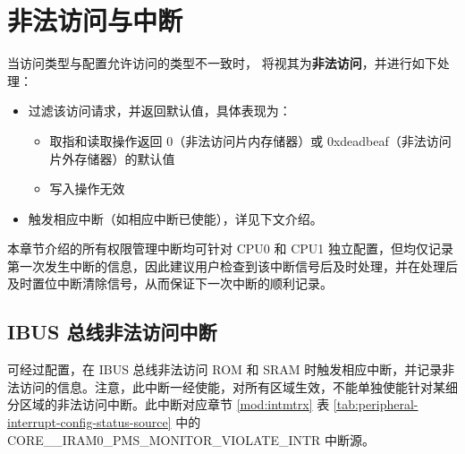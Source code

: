 \documentclass[main\_\_CN.tex]{subfiles}
\begin{document}
\section{非法访问与中断}

当访问类型与配置允许访问的类型不一致时，\chipname{} 将视其为\textbf{非法访问}，并进行如下处理：
\begin{itemize}
    \item 过滤该访问请求，并返回默认值，具体表现为：
    \begin{itemize}
        \item 取指和读取操作返回 0（非法访问片内存储器）或 0x{}deadbeaf（非法访问片外存储器）的默认值
        \item 写入操作无效
    \end{itemize}
    \item 触发相应中断（如相应中断已使能），详见下文介绍。
\end{itemize}


本章节介绍的所有权限管理中断均可针对 CPU0 和 CPU1 独立配置，但均仅记录第一次发生中断的信息，因此建议用户检查到该中断信号后及时处理，并在处理后及时置位中断清除信号，从而保证下一次中断的顺利记录。

\subsection{IBUS 总线非法访问中断}

\chipname{} 可经过配置，在 IBUS 总线非法访问 ROM 和 SRAM 时触发相应中断，并记录非法访问的信息。注意，此中断一经使能，对所有区域生效，不能单独使能针对某细分区域的非法访问中断。此中断对应章节 \ref{mod:intmtrx} \textit{} 表
\ref{tab:peripheral-interrupt-config-status-source} 中的 CORE\_\_IRAM0\_PMS\_MONITOR\_VIOLATE\_INTR 中断源。
\end{document}
